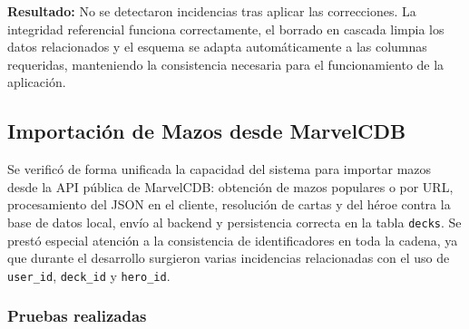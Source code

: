 \textbf{Resultado:} No se detectaron incidencias tras aplicar las correcciones. La integridad referencial funciona correctamente, el borrado en cascada limpia los datos relacionados y el esquema se adapta automáticamente a las columnas requeridas, manteniendo la consistencia necesaria para el funcionamiento de la aplicación.

\subsection{Importación de Mazos desde MarvelCDB}
\label{sec:import-marvelcdb}

Se verificó de forma unificada la capacidad del sistema para importar mazos desde la API pública de MarvelCDB: obtención de mazos populares o por URL, procesamiento del JSON en el cliente, resolución de cartas y del héroe contra la base de datos local, envío al backend y persistencia correcta en la tabla \texttt{decks}. Se prestó especial atención a la consistencia de identificadores en toda la cadena, ya que durante el desarrollo surgieron varias incidencias relacionadas con el uso de \texttt{user\_id}, \texttt{deck\_id} y \texttt{hero\_id}.

\subsubsection*{Pruebas realizadas}

